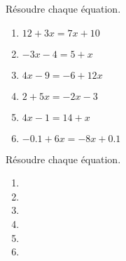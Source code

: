 \begin{exercice*}
    Résoudre chaque équation.
    \begin{multicols}{2}
        \begin{enumerate}
            \item $12+3x=7x+10$
            \item $-3x-4=5+x$
            \item $4x-9=-6+12x$
            \item $2+5x=-2x-3$
            \item $4x-1=14+x$
            \item $\num{-0.1}+6x=-8x+\num{0.1}$
        \end{enumerate}
    \end{multicols}
\end{exercice*}
\begin{corrige}
    Résoudre chaque équation.
    {\setlength{\columnseprule}{0pt}
    \begin{multicols}{2}
        \begin{enumerate}            
            \item \phantom{rrr}
            
            \hspace*{-5mm}\begin{minipage}{\linewidth}
            \end{minipage}
            \item \phantom{rrr}
            \hspace*{-5mm}\begin{minipage}{\linewidth}
            \end{minipage}
            \item \phantom{rrr}
            \hspace*{-5mm}\begin{minipage}{\linewidth}
            \end{minipage}
            \item \phantom{rrr}
            \begin{minipage}{\linewidth}
            \end{minipage}
            \item \phantom{rrr}
            \begin{minipage}{\linewidth}
            \end{minipage}
            \item \phantom{rrr}
            \begin{minipage}{\linewidth}
            \end{minipage}
        \end{enumerate}
    \end{multicols}    
    }
\end{corrige}

